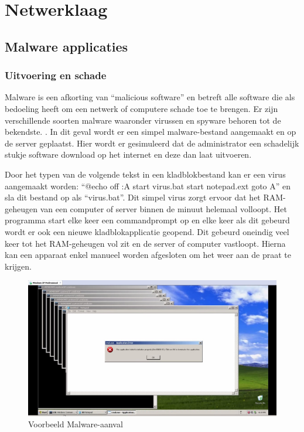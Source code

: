\documentclass[pdftex,a4paper,12pt]{report}
\begin{document}
\section{Netwerklaag}
\subsection{Malware applicaties}
\subsubsection{Uitvoering en schade}
Malware is een afkorting van "`malicious software"' en betreft alle software die als bedoeling heeft om een netwerk of computere schade toe te brengen. Er zijn verschillende soorten malware waaronder virussen en spyware behoren tot de bekendste. \citep{Moir2003}. In dit geval wordt er een simpel malware-bestand aangemaakt en op de server geplaatst. Hier wordt er gesimuleerd dat de administrator een schadelijk stukje software download op het internet en deze dan laat uitvoeren. \newline

Door het typen van de volgende tekst in een kladblokbestand kan er een virus aangemaakt worden: "`@echo off :A start virus.bat start notepad.ext goto A"' en sla dit bestand op als "`virus.bat"'. Dit simpel virus zorgt ervoor dat het RAM-geheugen van een computer of server binnen de minuut helemaal volloopt. Het programma start elke keer een commandprompt op en elke keer als dit gebeurd wordt er ook een nieuwe kladblokapplicatie geopend. Dit gebeurd oneindig veel keer tot het RAM-geheugen vol zit en de server of computer vastloopt. Hierna kan een apparaat enkel manueel worden afgesloten om het weer aan de praat te krijgen.

\begin{figure}[h!]
\begin{center}
\includegraphics[scale=0.60]{img/MalwareVoorbeeld}
\end{center}
\caption{Voorbeeld Malware-aanval}
\end{figure}
\end{document}
